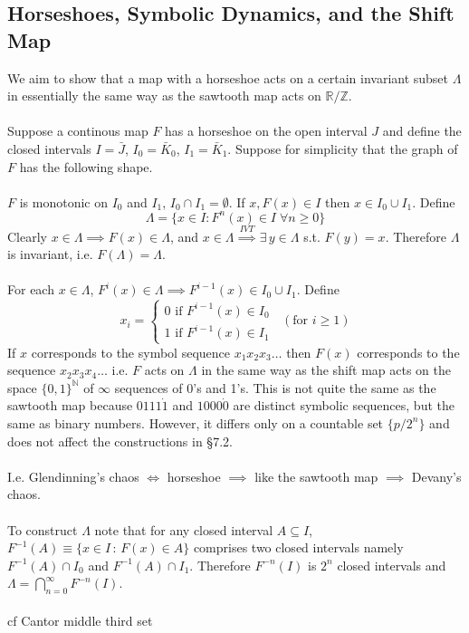 \documentclass{article}
\begin{document}
\subsection{Horseshoes, Symbolic Dynamics, and the Shift Map}
We aim to show that a map with a horseshoe acts on a certain invariant 
subset $\Lambda$ in essentially the same way as the sawtooth map acts on 
$\mathbb{R}/\mathbb{Z}$.
\\
\\
Suppose a continous map $F$ has a horseshoe on the 
open interval $J$ and define the closed intervals $I = \bar{J}$, 
$I_0 = \bar{K}_0$, $I_1 = \bar{K}_1$. Suppose for simplicity that the graph
of $F$ has the following shape.
\\
\\
$F$ is monotonic on $I_0$ and $I_1$, $I_0 \cap I_1 = \emptyset$. If 
$x,F(x) \in I$ then $x \in I_0 \cup I_1$. Define
\[ \Lambda = \{ x \in I : F^n(x) \in I \; \forall n \geq 0\} \]
Clearly $x \in \Lambda \implies F(x) \in  \Lambda$, and 
$x \in \Lambda \overset{IVT}{\implies} \exists \, y \in \Lambda$ s.t. 
$F(y)=x$. Therefore $\Lambda$ is invariant, i.e. $F(\Lambda) = \Lambda$.
\\
\\
For each $x \in \Lambda$, $F^i(x) \in \Lambda \implies F^{i-1}(x) \in 
I_0 \cup I_1$. Define
\[ x_ i = \left\{ \begin{array}{c}
0 \mbox{ if } F^{i-1}(x) \in I_0 \\
1 \mbox{ if } F^{i-1}(x) \in I_1
\end{array} \right. \;\; (\mbox{for }i \geq 1) \]
If $x$ corresponds to the symbol sequence $x_1x_2x_3 \dots$
then $F(x)$ corresponds to the sequence $x_2x_3x_4 \dots$
i.e. $F$ acts on $\Lambda$ in the same way as the shift map acts
on the space $\{0,1\}^{\mathbb{N}}$ of $\infty$ sequences of 0's  and 1's.
This is not quite the same as the sawtooth map because
$0111\dot{1}$ and $1000\dot{0}$ are distinct symbolic sequences, but the same
as binary numbers. However, it differs only on a countable set $\{p/2^n\}$ and
does not affect the constructions in \S 7.2.
\\
\\
I.e. Glendinning's chaos $\iff$ horseshoe $\implies$ like the sawtooth map 
$\implies$ Devany's chaos. 
\\
\\
To construct $\Lambda$ note that for any closed interval 
$A \subseteq I$, $F^{-1}(A) \equiv \{ x \in I \, : \, F(x) \in A \}$ comprises
two closed intervals namely $F^{-1}(A) \cap I_0$ and $F^{-1}(A) \cap I_1$.
Therefore $F^{-n}(I)$ is $2^n$ closed intervals and $\Lambda = 
\bigcap_{n=0}^{\infty} F^{-n}(I) $.
\\
\\
cf Cantor middle third set
\end{document}
